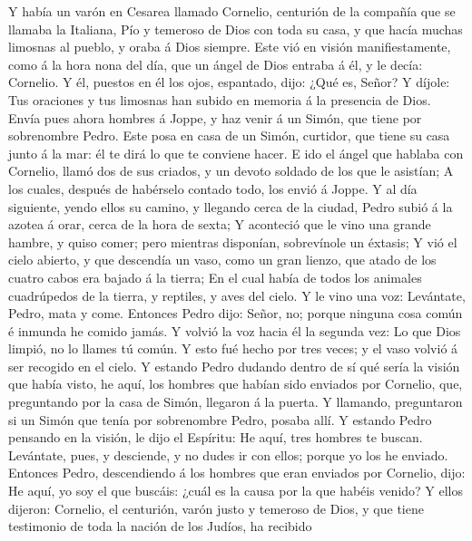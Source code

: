  Y había un varón en Cesarea llamado Cornelio, centurión de
la compañía que se llamaba la Italiana,  Pío y temeroso de
Dios con toda su casa, y que hacía muchas limosnas al pueblo, y oraba á
Dios siempre.  Este vió en visión manifiestamente, como á la
hora nona del día, que un ángel de Dios entraba á él, y le decía:
Cornelio.  Y él, puestos en él los ojos, espantado, dijo:
¿Qué es, Señor? Y díjole: Tus oraciones y tus limosnas han subido en
memoria á la presencia de Dios.  Envía pues ahora hombres á
Joppe, y haz venir á un Simón, que tiene por sobrenombre Pedro.
 Este posa en casa de un Simón, curtidor, que tiene su casa
junto á la mar: él te dirá lo que te conviene hacer.  E ido
el ángel que hablaba con Cornelio, llamó dos de sus criados, y un devoto
soldado de los que le asistían;  A los cuales, después de
habérselo contado todo, los envió á Joppe.  Y al día
siguiente, yendo ellos su camino, y llegando cerca de la ciudad, Pedro
subió á la azotea á orar, cerca de la hora de sexta;  Y
aconteció que le vino una grande hambre, y quiso comer; pero mientras
disponían, sobrevínole un éxtasis;  Y vió el cielo abierto,
y que descendía un vaso, como un gran lienzo, que atado de los cuatro
cabos era bajado á la tierra;  En el cual había de todos
los animales cuadrúpedos de la tierra, y reptiles, y aves del cielo.
 Y le vino una voz: Levántate, Pedro, mata y come.
 Entonces Pedro dijo: Señor, no; porque ninguna cosa común
é inmunda he comido jamás.  Y volvió la voz hacia él la
segunda vez: Lo que Dios limpió, no lo llames tú común.  Y
esto fué hecho por tres veces; y el vaso volvió á ser recogido en el
cielo.  Y estando Pedro dudando dentro de sí qué sería la
visión que había visto, he aquí, los hombres que habían sido enviados
por Cornelio, que, preguntando por la casa de Simón, llegaron á la
puerta.  Y llamando, preguntaron si un Simón que tenía por
sobrenombre Pedro, posaba allí.  Y estando Pedro pensando
en la visión, le dijo el Espíritu: He aquí, tres hombres te buscan.
 Levántate, pues, y desciende, y no dudes ir con ellos;
porque yo los he enviado.  Entonces Pedro, descendiendo á
los hombres que eran enviados por Cornelio, dijo: He aquí, yo soy el que
buscáis: ¿cuál es la causa por la que habéis venido?  Y
ellos dijeron: Cornelio, el centurión, varón justo y temeroso de Dios, y
que tiene testimonio de toda la nación de los Judíos, ha recibido
